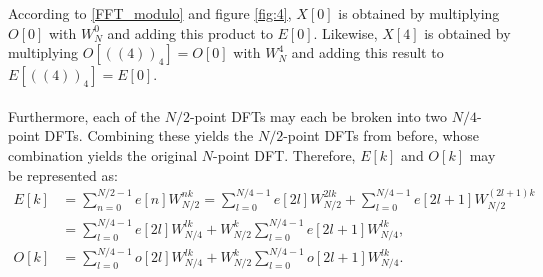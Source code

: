According to \eqref{FFT_modulo} and figure \ref{fig:4}, $X[0]$ is obtained by multiplying $O[0]$ with $W_N^0$ and adding this product to $E[0]$. Likewise, $X[4]$ is obtained by multiplying $O[((4))_4] = O[0]$ with $W_N^4$ and adding this result to $E[((4))_4] = E[0]$.
\\ \\
Furthermore, each of the $N/2$-point DFTs may each be broken into two $N/4$-point DFTs. Combining these yields the $N/2$-point DFTs from before, whose combination yields the original $N$-point DFT. Therefore, $E[k]$ and $O[k]$ may be represented as:
\begin{align*}
E[k] &= \sum_{n=0}^{N/2-1} e[n] W_{N/2}^{nk} = \sum_{l=0}^{N/4-1} e[2l] W_{N/2}^{2lk} + \sum_{l=0}^{N/4-1} e[2l+1] W_{N/2}^{(2l+1)k} \\
&= \sum_{l=0}^{N/4-1} e[2l] W_{N/4}^{lk} + W_{N/2}^k \sum_{l=0}^{N/4-1} e[2l+1] W_{N/4}^{lk}, \\
O[k] &= \sum_{l=0}^{N/4-1} o[2l] W_{N/4}^{lk} + W_{N/2}^k \sum_{l=0}^{N/4-1} o[2l+1] W_{N/4}^{lk}.
\end{align*}


